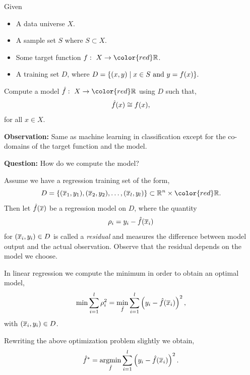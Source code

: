 \documentclass[a4paper,blends,pdf,colorBG,slideColor]{prosper}
\begin{document}
Given
\begin{itemize}
\item A data universe $X$.
\item A sample set $S$ where $S \subset X$.
\item Some target function $f\co X \rightarrow {\color{red}\Real}$.
\item A training set $D$, where
$
D = \{ (x ,y) \mid x \in S \text{ and } y = f(x)\}.
$
\end{itemize}
Compute a model $\model{f}\co X \rightarrow {\color{red}\Real}$ using $D$ such that,
\begin{equation*}
\hat{f}(x) \cong f(x),
\end{equation*}
for all $x \in X$.

\vspace{.1in}

{\bf Observation:}  Same as machine learning in classification except for the co-domains 
of the target function and the model.

{\bf Question:} How do we compute the model?

\es

\small
Assume we have a regression training set of the form,
\begin{equation*}
D = \{(\ol{x}_1,y_1), (\ol{x}_2,y_2),\ldots,(\ol{x}_l,y_l)\} \subset \Rnspace{n} \times {\color{red}\Real}.
\end{equation*}
Then let  $\hat{f}(\overline{x})$
be a regression model on $D$,
where the quantity
\begin{equation*}
\rho_i = y_i - \hat{f}(\overline{x}_i)
\end{equation*}
for $(\overline{x}_i,y_i)\in D$ is called a {\em residual} and measures the difference between
model output and the actual observation.  Observe that the residual depends on the model 
we choose.

In linear regression we compute the minimum 
in order to obtain an optimal model,
\begin{equation*}
\min \sum_{i = 1}^l \rho_i^2 = \min_{\hat{f}} \sum_{i=1}^l \left( y_i - \hat{f}(\overline{x}_i)\right )^2,
\end{equation*}
with $(\overline{x}_i,y_i)\in D$.

Rewriting the above optimization problem slightly we obtain,
\begin{equation*}
\model{f}^* = \argmin_{\model{f}} \sum_{i=1}^l \left( y_i - \model{f}(\ol{x}_i)\right )^2.
\end{equation*}
\es
\end{document}
